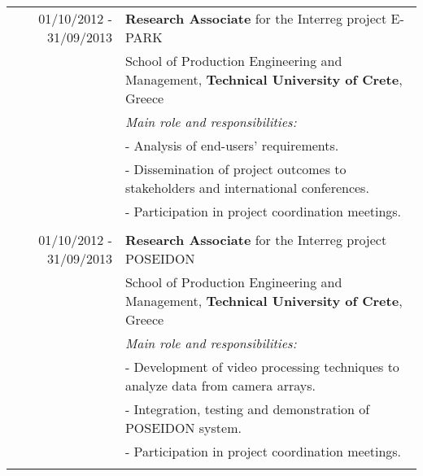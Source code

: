 \documentclass[a4paper,10pt]{article}
\begin{document}
\begin{longtable}{r|p{11cm}}
	01/10/2012 - 31/09/2013 & \textbf{Research Associate} for the Interreg project E-PARK \\ 
	& School of Production Engineering and Management, \textbf{Technical University of Crete}, Greece\\
	& \textit{\small{Main role and responsibilities:}} \\
	& \footnotesize{- Analysis of end-users' requirements.}\\
	& \footnotesize{- Dissemination of project outcomes to stakeholders and international conferences.}\\
	& \footnotesize{- Participation in project coordination meetings.}\\
	\multicolumn{2}{c}{} \\
	
	01/10/2012 - 31/09/2013 & \textbf{Research Associate} for the Interreg project POSEIDON \\ 
	& School of Production Engineering and Management, \textbf{Technical University of Crete}, Greece\\
	& \textit{\small{Main role and responsibilities:}} \\
	& \footnotesize{- Development of video processing techniques to analyze data from camera arrays.}\\
	& \footnotesize{- Integration, testing and demonstration of POSEIDON system.}\\
	& \footnotesize{- Participation in project coordination meetings.}\\
	\multicolumn{2}{c}{} \\
\end{longtable}

\end{document}
